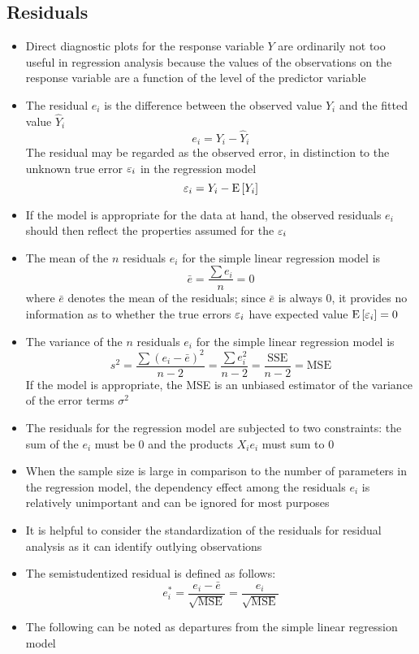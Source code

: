 \subsection{Residuals}
\begin{itemize}
\item Direct diagnostic plots for the response variable $Y$ are ordinarily not too useful in regression analysis because the values of the observations on the response variable are a function of the level of the predictor variable 
\item The residual $e_i$ is the difference between the observed value $Y_i$ and the fitted value $\hat{Y}_i$ $$ e_i = Y_i - \hat{Y}_i$$ The residual may be regarded as the observed error, in distinction to the unknown true error $\varepsilon_i$ in the regression model $$ \varepsilon_i = Y_i - \mathrm{E}\left[ Y_i \right] $$ 
\item If the model is appropriate for the data at hand, the observed residuals $e_i$ should then reflect the properties assumed for the $\varepsilon_i$
\item The mean of the $n$ residuals $e_i$ for the simple linear regression model is $$ \bar{e} = \frac{\sum e_i}{n} = 0 $$ where $\bar{e}$ denotes the mean of the residuals; since $\bar{e}$ is always $0$, it provides no information as to whether the true errors $\varepsilon_i$ have expected value $\mathrm{E}\left[ \varepsilon_i \right] = 0$ 
\item The variance of the $n$ residuals $e_i$ for the simple linear regression model is $$ s^2 = \frac{\sum (e_i - \bar{e})^2}{n-2} = \frac{\sum e_i^2}{n-2} = \frac{\text{SSE}}{n-2} = \text{MSE} $$ If the model is appropriate, the MSE is an unbiased estimator of the variance of the error terms $\sigma^2$ 
\item The residuals for the regression model are subjected to two constraints: the sum of the $e_i$ must be $0$ and the products $X_ie_i$ must sum to $0$
\item When the sample size is large in comparison to the number of parameters in the regression model, the dependency effect among the residuals $e_i$ is relatively unimportant and can be ignored for most purposes
\item It is helpful to consider the standardization of the residuals for residual analysis as it can identify outlying observations 
\item The semistudentized residual is defined as follows: $$ e_i^* = \frac{e_i - \bar{e}}{\sqrt{\text{MSE}}} = \frac{e_i}{\sqrt{\text{MSE}}} $$ 
\item The following can be noted as departures from the simple linear regression model \begin{itemize} 

\end{itemize}
\end{itemize}

